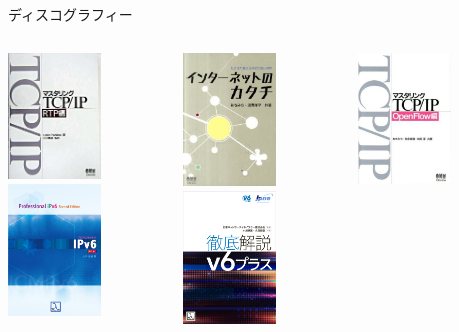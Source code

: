\documentclass[13pt,dvipdfmx,uplatex]{beamer}
\begin{document}
\begin{frame}[plain]
  \begin{center}
    \color{kachi}\yasagoth
    ディスコグラフィー

    \begin{columns}
      \begin{column}[t]{0.3\textwidth}
      \centering
        \includegraphics[width=70pt]{figures/rtp.jpg}\\
        \includegraphics[width=70pt]{figures/ipv6-2.jpg}
      \end{column}
      \begin{column}[t]{0.3\textwidth}
      \centering
        \includegraphics[width=70pt]{figures/katachi.jpg}\\
        \includegraphics[width=70pt]{figures/v6plus.png}
      \end{column}
      \begin{column}[t]{0.3\textwidth}
      \centering
        \includegraphics[width=70pt]{figures/openflow.jpg}\\

\end{column}
\end{columns}
\end{center}
\end{frame}
\end{document}
